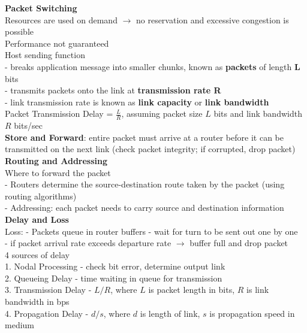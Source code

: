 \documentclass[10pt, a4paper]{article}
\newcommand{\highlight}[1]{{\color{red}\textbf{#1}}}
\newcommand{\red}[1]{{\color{red}#1}}
\begin{document}
\begin{multicols*}{3}
		\textbf{Packet Switching}\\
		Resources are used on demand $\rightarrow$ no reservation and excessive congestion is possible\\
		Performance not guaranteed\\
		Host sending function\\
		- breaks application message into smaller chunks, known as \highlight{packets} of length \highlight{L} bits\\
		- transmits packets onto the link at \highlight{transmission rate R}\\
		- link transmission rate is known as \highlight{link capacity} or \highlight{link bandwidth}\\
		
		Packet Transmission Delay = $\frac{L}{R}$, assuming packet size $L$ bits and link bandwidth $R$ bits/sec\\
		
		\highlight{Store and Forward}: entire packet must arrive at a router before it can be transmitted on the next link (check packet integrity; if corrupted, drop packet)\\
		
		\textbf{Routing and Addressing}\\
		Where to forward the packet\\
		- \red{Routers} determine the source-destination route taken by the packet (using routing algorithms)\\
		- \red{Addressing}: each packet needs to carry source and destination information\\

		\textbf{Delay and Loss}\\
		Loss:
		- Packets queue in router buffers - wait for turn to be sent out one by one\\
		- if packet arrival rate exceeds departure rate $\rightarrow$ buffer full and drop packet\\

		4 sources of delay\\

		1. Nodal Processing - check bit error, determine output link\\
		2. Queueing Delay - time waiting in queue for transmission\\
		3. Transmission Delay - $L/R$, where $L$ is packet length in bits, $R$ is link bandwidth in bps\\
		4. Propagation Delay - $d/s$, where $d$ is length of link, $s$ is propagation speed in medium\\


\end{multicols*}
\end{document}
